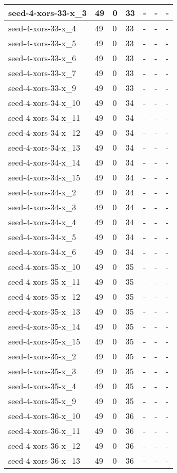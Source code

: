 \begin{scriptsize}
\begin{longtable}{|p{5cm}|l|l|l|l|l|l|}
seed-4-xors-33-x\_3&49&0&33&-&-&- \\ \hline 
seed-4-xors-33-x\_4&49&0&33&-&-&- \\ \hline 
seed-4-xors-33-x\_5&49&0&33&-&-&- \\ \hline 
seed-4-xors-33-x\_6&49&0&33&-&-&- \\ \hline 
seed-4-xors-33-x\_7&49&0&33&-&-&- \\ \hline 
seed-4-xors-33-x\_9&49&0&33&-&-&- \\ \hline 
seed-4-xors-34-x\_10&49&0&34&-&-&- \\ \hline 
seed-4-xors-34-x\_11&49&0&34&-&-&- \\ \hline 
seed-4-xors-34-x\_12&49&0&34&-&-&- \\ \hline 
seed-4-xors-34-x\_13&49&0&34&-&-&- \\ \hline 
seed-4-xors-34-x\_14&49&0&34&-&-&- \\ \hline 
seed-4-xors-34-x\_15&49&0&34&-&-&- \\ \hline 
seed-4-xors-34-x\_2&49&0&34&-&-&- \\ \hline 
seed-4-xors-34-x\_3&49&0&34&-&-&- \\ \hline 
seed-4-xors-34-x\_4&49&0&34&-&-&- \\ \hline 
seed-4-xors-34-x\_5&49&0&34&-&-&- \\ \hline 
seed-4-xors-34-x\_6&49&0&34&-&-&- \\ \hline 
seed-4-xors-35-x\_10&49&0&35&-&-&- \\ \hline 
seed-4-xors-35-x\_11&49&0&35&-&-&- \\ \hline 
seed-4-xors-35-x\_12&49&0&35&-&-&- \\ \hline 
seed-4-xors-35-x\_13&49&0&35&-&-&- \\ \hline 
seed-4-xors-35-x\_14&49&0&35&-&-&- \\ \hline 
seed-4-xors-35-x\_15&49&0&35&-&-&- \\ \hline 
seed-4-xors-35-x\_2&49&0&35&-&-&- \\ \hline 
seed-4-xors-35-x\_3&49&0&35&-&-&- \\ \hline 
seed-4-xors-35-x\_4&49&0&35&-&-&- \\ \hline 
seed-4-xors-35-x\_9&49&0&35&-&-&- \\ \hline 
seed-4-xors-36-x\_10&49&0&36&-&-&- \\ \hline 
seed-4-xors-36-x\_11&49&0&36&-&-&- \\ \hline 
seed-4-xors-36-x\_12&49&0&36&-&-&- \\ \hline 
seed-4-xors-36-x\_13&49&0&36&-&-&- \\ \hline 

\end{longtable}
\end{scriptsize}
